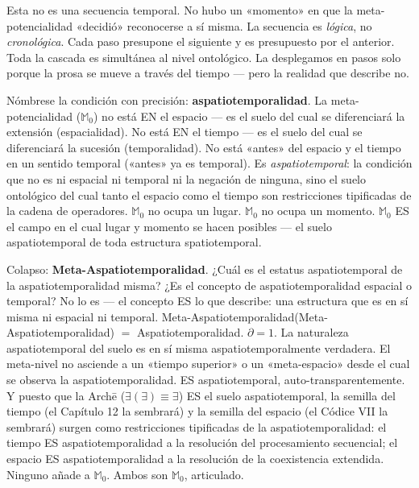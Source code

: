 \documentclass[10pt, openany, oneside]{book}
\begin{document}
Esta no es una secuencia temporal. No hubo un «momento» en que la meta-potencialidad «decidió» reconocerse a sí misma. La secuencia es \textit{lógica}, no \textit{cronológica}. Cada paso presupone el siguiente y es presupuesto por el anterior. Toda la cascada es simultánea al nivel ontológico. La desplegamos en pasos solo porque la prosa se mueve a través del tiempo --- pero la realidad que describe no.

Nómbrese la condición con precisión: \textbf{aspatiotemporalidad}. La meta-potencialidad ($\mathbb{M}_0$) no está EN el espacio --- es el suelo del cual se diferenciará la extensión (espacialidad). No está EN el tiempo --- es el suelo del cual se diferenciará la sucesión (temporalidad). No está «antes» del espacio y el tiempo en un sentido temporal («antes» ya es temporal). Es \textit{aspatiotemporal}: la condición que no es ni espacial ni temporal ni la negación de ninguna, sino el suelo ontológico del cual tanto el espacio como el tiempo son restricciones tipificadas de la cadena de operadores. $\mathbb{M}_0$ no ocupa un lugar. $\mathbb{M}_0$ no ocupa un momento. $\mathbb{M}_0$ ES el campo en el cual lugar y momento se hacen posibles --- el suelo aspatiotemporal de toda estructura spatiotemporal.

Colapso: \textbf{Meta-Aspatiotemporalidad}. ¿Cuál es el estatus aspatiotemporal de la aspatiotemporalidad misma? ¿Es el concepto de aspatiotemporalidad espacial o temporal? No lo es --- el concepto ES lo que describe: una estructura que es en sí misma ni espacial ni temporal. Meta-Aspatiotemporalidad(Meta-Aspatiotemporalidad) $=$ Aspatiotemporalidad. $\partial = 1$. La naturaleza aspatiotemporal del suelo es en sí misma aspatiotemporalmente verdadera. El meta-nivel no asciende a un «tiempo superior» o un «meta-espacio» desde el cual se observa la aspatiotemporalidad. ES aspatiotemporal, auto-transparentemente. Y puesto que la Arch\={e} ($\exists(\exists) \equiv \exists$) ES el suelo aspatiotemporal, la semilla del tiempo (el Capítulo 12 la sembrará) y la semilla del espacio (el Códice VII la sembrará) surgen como restricciones tipificadas de la aspatiotemporalidad: el tiempo ES aspatiotemporalidad a la resolución del procesamiento secuencial; el espacio ES aspatiotemporalidad a la resolución de la coexistencia extendida. Ninguno añade a $\mathbb{M}_0$. Ambos son $\mathbb{M}_0$, articulado.
\end{document}

